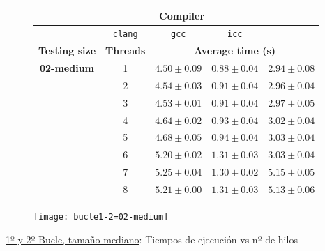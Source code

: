 \begin{figure}[H]
    \centering
    \begin{subfigure}{0.4\textwidth}
        \begin{adjustbox}{width=\textwidth} 
        \begin{tabular}{|c|c|c|c|c|}
            \hline
            \rowcolor{azul} \multicolumn{2}{|c|}{}&\multicolumn{3}{c|}{\textbf{Compiler}} \\ \hline
            \rowcolor{azul} \multicolumn{2}{|c|}{}&\texttt{clang}&\texttt{gcc}&\texttt{icc}\\ \hline
            \rowcolor{azul} \textbf{Testing size} & \textbf{Threads}&\multicolumn{3}{c|}{\textbf{Average time (s)}} \\ \hline
            \multirow{8}{2.5cm}{\textbf{02-medium}} & 1 & \(4.50\pm{0.09}\) & \(0.88\pm{0.04}\) & \(2.94\pm{0.08}\) \\ \cline{2-5}
            & 2 & \(4.54\pm{0.03}\) & \(0.91\pm{0.04}\) & \(2.96\pm{0.04}\) \\ \cline{2-5}
            & 3 & \(4.53\pm{0.01}\) & \(0.91\pm{0.04}\) & \(2.97\pm{0.05}\) \\ \cline{2-5}
            & 4 & \(4.64\pm{0.02}\) & \(0.93\pm{0.04}\) & \(3.02\pm{0.04}\) \\ \cline{2-5}
            & 5 & \(4.68\pm{0.05}\) & \(0.94\pm{0.04}\) & \(3.03\pm{0.04}\) \\ \cline{2-5}
            & 6 & \(5.20\pm{0.02}\) & \(1.31\pm{0.03}\) & \(3.03\pm{0.04}\) \\ \cline{2-5}
            & 7 & \(5.25\pm{0.04}\) & \(1.30\pm{0.02}\) & \(5.15\pm{0.05}\) \\ \cline{2-5}
            & 8 & \(5.21\pm{0.00}\) & \(1.31\pm{0.03}\) & \(5.13\pm{0.06}\) \\ \hline
        \end{tabular}
        \end{adjustbox}
    \end{subfigure}
    \hfill
    \begin{subfigure}{0.5\textwidth}
        \texttt{[image: bucle1-2=02-medium]}
    \end{subfigure}
    \caption{\underline{1º y 2º Bucle, tamaño mediano}: Tiempos de ejecución vs nº de hilos}
    \label{bucle1-2=02-medium}
\end{figure}

